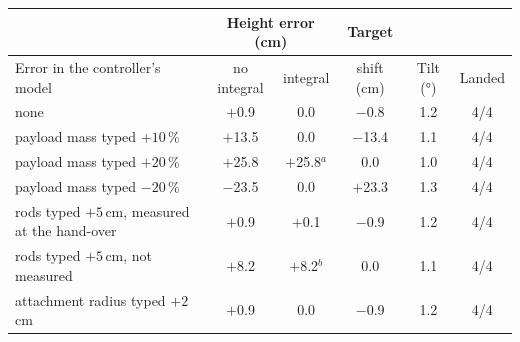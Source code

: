 \begin{tabularx}{\textwidth}{>{\raggedright\arraybackslash}Xccccc}
\toprule
 & \multicolumn{2}{c}{Height error (cm)} & Target & & \\
\cmidrule(lr){2-3}
Error in the controller's model & no integral & integral & shift (cm) & Tilt (\si{\degree}) & Landed \\
\midrule
none & $+$0.9 & 0.0 & $-$0.8 & 1.2 & 4/4 \\
payload mass typed $+10$\,\% & $+$13.5 & 0.0 & $-$13.4 & 1.1 & 4/4 \\
payload mass typed $+20$\,\% & $+$25.8 & $+$25.8$^a$ & 0.0 & 1.0 & 4/4 \\
payload mass typed $-20$\,\% & $-$23.5 & 0.0 & $+$23.3 & 1.3 & 4/4 \\
rods typed $+5$\,cm, measured at the hand-over & $+$0.9 & $+$0.1 & $-$0.9 & 1.2 & 4/4 \\
rods typed $+5$\,cm, not measured & $+$8.2 & $+$8.2$^b$ & 0.0 & 1.1 & 4/4 \\
attachment radius typed $+2$\,cm & $+$0.9 & 0.0 & $-$0.9 & 1.2 & 4/4 \\
\bottomrule
\end{tabularx}
